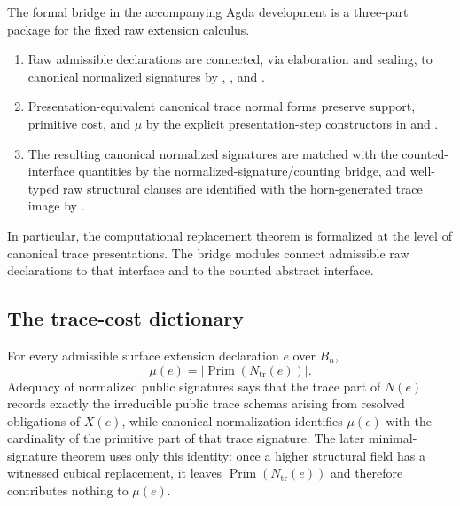 \documentclass{lmcs}
\begin{document}
\begin{rem}
The formal bridge in the accompanying Agda development is a three-part package for the
fixed raw extension calculus.

\begin{enumerate}
\item Raw admissible declarations are connected, via elaboration and sealing, to canonical
normalized signatures by
,
, and
.

\item Presentation-equivalent canonical trace normal forms preserve support, primitive cost,
and \(\mu\) by the explicit presentation-step constructors in
 and
.

\item The resulting canonical normalized signatures are matched with the counted-interface
quantities by the normalized-signature/counting bridge, and well-typed raw structural clauses
are identified with the horn-generated trace image by
.
\end{enumerate}

In particular, the computational replacement theorem is formalized at the level of canonical
trace presentations.  The bridge modules connect admissible raw declarations to that
interface and to the counted abstract interface.
\end{rem}

\subsection{The trace-cost dictionary}

For every admissible surface extension declaration \(e\) over \(B_n\),
\[
  \mu(e)
  =
  \left|\operatorname{Prim}(N_{\mathrm{tr}}(e))\right|.
\]
Adequacy of normalized public signatures says that the trace part of \(N(e)\) records exactly
the irreducible public trace schemas arising from resolved obligations of \(X(e)\), while
canonical normalization identifies \(\mu(e)\) with the cardinality of the primitive part of
that trace signature.  The later minimal-signature theorem uses only this identity: once a
higher structural field has a witnessed cubical replacement, it leaves
\(\operatorname{Prim}(N_{\mathrm{tr}}(e))\) and therefore contributes nothing to \(\mu(e)\).
\end{document}
